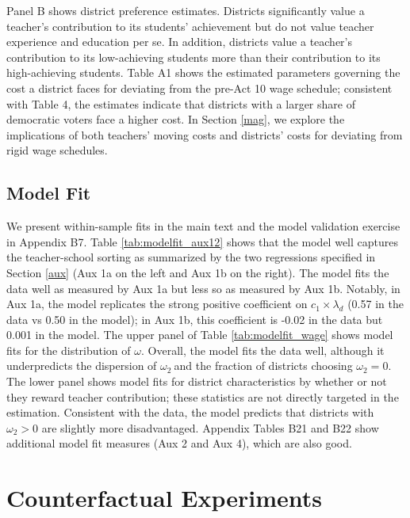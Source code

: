 \documentclass[notitlepage,12pt]{article}%
\begin{document}
Panel B shows district preference estimates. Districts significantly value a
teacher's contribution to its students' achievement but do not value teacher
experience and education per se. In addition, districts value a teacher's
contribution to its low-achieving students more than their contribution to its
high-achieving students. Table A1 shows the estimated parameters governing the
cost a district faces for deviating from the pre-Act 10 wage schedule;
consistent with Table 4, the estimates indicate that districts with a larger
share of democratic voters face a higher cost. In Section \ref{mag}, we
explore the implications of both teachers' moving costs and districts' costs
for deviating from rigid wage schedules.

\subsection{Model Fit\label{within fit}}

We present within-sample fits in the main text and the model validation exercise in Appendix B7. Table \ref{tab:modelfit_aux12} shows that the model well captures the
teacher-school sorting as summarized by the two regressions specified in
Section \ref{aux} (Aux 1a on the left and Aux 1b on the right). The model fits
the data well as measured by Aux 1a but less so as measured by Aux 1b.
Notably, in Aux 1a, the model replicates the strong positive coefficient on
$c_{1}\times\lambda_{d}$ (0.57 in the data vs 0.50 in the model); in Aux 1b,
this coefficient is -0.02 in the data but 0.001 in the model. The upper panel
of Table \ref{tab:modelfit_wage} shows model fits for the distribution of
$\omega.$ Overall, the model fits the data well, although it underpredicts the
dispersion of $\omega_{2}\ $and the fraction of districts choosing $\omega
_{2}=0$. The lower panel shows model fits for district characteristics by
whether or not they reward teacher contribution; these statistics are not
directly targeted in the estimation. Consistent with the data, the model
predicts that districts with $\omega_{2}>0$ are slightly more disadvantaged.
Appendix Tables B21 and B22 show additional model fit measures (Aux 2
and Aux 4), which are also good. 


\section{Counterfactual Experiments}
\end{document}

